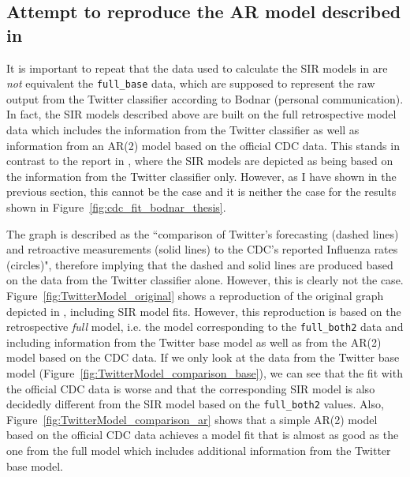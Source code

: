 \documentclass[11pt, a4paper,twoside]{report}\usepackage[]{graphicx}\usepackage[]{color}
\begin{document}
\subsection{Attempt to reproduce the AR model described in \cite{bodnar_data_2015}}
It is important to repeat that the data used to calculate the SIR models in \cite{bodnar_data_2015} are \textit{not} equivalent the \texttt{full\_base} data, which are supposed to represent the raw output from the Twitter classifier according to Bodnar (personal communication). In fact, the SIR models described above are built on the full retrospective model data which includes the information from the Twitter classifier as well as information from an AR(2) model based on the official CDC data. This stands in contrast to the report in \cite{bodnar_data_2015}, where the SIR models are depicted as being based on the information from the Twitter classifier only. However, as I have shown in the previous section, this cannot be the case and it is neither the case for the results shown in Figure~\ref{fig:cdc_fit_bodnar_thesis}.

The graph is described as the ``comparison of Twitter's forecasting (dashed lines) and retroactive measurements (solid lines) to the CDC's reported Influenza rates (circles)", therefore implying that the dashed and solid lines are produced based on the data from the Twitter classifier alone. However, this is clearly not the case. Figure~\ref{fig:TwitterModel_original} shows a reproduction of the original graph depicted in \citep{bodnar_data_2015}, including SIR model fits. However, this reproduction is based on the retrospective \textit{full} model, i.e. the model corresponding to the \texttt{full\_both2} data and including information from the Twitter base model as well as from the AR(2) model based on the CDC data. If we only look at the data from the Twitter base model (Figure~\ref{fig:TwitterModel_comparison_base}), we can see that the fit with the official CDC data is worse and that the corresponding SIR model is also decidedly different from the SIR model based on the \texttt{full\_both2} values. Also, Figure~\ref{fig:TwitterModel_comparison_ar} shows that a simple AR(2) model based on the official CDC data achieves a model fit that is almost as good as the one from the full model which includes additional information from the Twitter base model.
\end{document}

